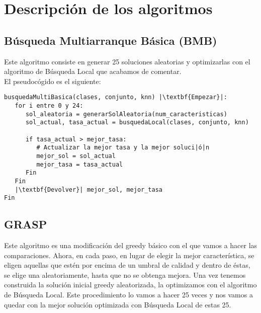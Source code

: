 \documentclass[12pt]{article}
\begin{document}
\newpage

\section{Descripción de los algoritmos}

\subsection{Búsqueda Multiarranque Básica (BMB)}

Este algoritmo consiste en generar 25 soluciones aleatorias y optimizarlas con el algoritmo de Búsqueda Local que acabamos de comentar.\\
El pseudocógido es el siguiente:
\begin{lstlisting}
busquedaMultiBasica(clases, conjunto, knn) |\textbf{Empezar}|:
   for i entre 0 y 24:
      sol_aleatoria = generarSolAleatoria(num_caracteristicas)
      sol_actual, tasa_actual = busquedaLocal(clases, conjunto, knn)
		
      if tasa_actual > mejor_tasa:
         # Actualizar la mejor tasa y la mejor soluci|ó|n
         mejor_sol = sol_actual
         mejor_tasa = tasa_actual
      Fin
   Fin
   |\textbf{Devolver}| mejor_sol, mejor_tasa
Fin
\end{lstlisting}

\subsection{GRASP}

Este algoritmo es una modificación del greedy básico con el que vamos a hacer las comparaciones. Ahora, en cada paso, en lugar de elegir la mejor característica, se eligen aquellas que estén por encima de un umbral de calidad y dentro de éstas, se elige una aleatoriamente, hasta que no se obtenga mejora. Una vez tenemos construida la solución inicial greedy aleatorizada, la optimizamos con el algoritmo de Búsqueda Local. Este procedimiento lo vamos a hacer 25 veces y nos vamos a quedar con la mejor solución optimizada con Búsqueda Local de estas 25.\\
\end{document}
